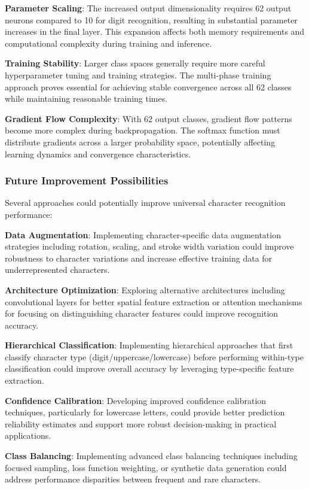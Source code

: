 \documentclass[11pt,a4paper]{report}
\begin{document}
\textbf{Parameter Scaling}: The increased output dimensionality requires 62 output neurons compared to 10 for digit recognition, resulting in substantial parameter increases in the final layer. This expansion affects both memory requirements and computational complexity during training and inference.

\textbf{Training Stability}: Larger class spaces generally require more careful hyperparameter tuning and training strategies. The multi-phase training approach proves essential for achieving stable convergence across all 62 classes while maintaining reasonable training times.

\textbf{Gradient Flow Complexity}: With 62 output classes, gradient flow patterns become more complex during backpropagation. The softmax function must distribute gradients across a larger probability space, potentially affecting learning dynamics and convergence characteristics.

\subsubsection{Future Improvement Possibilities}

Several approaches could potentially improve universal character recognition performance:

\textbf{Data Augmentation}: Implementing character-specific data augmentation strategies including rotation, scaling, and stroke width variation could improve robustness to character variations and increase effective training data for underrepresented characters.

\textbf{Architecture Optimization}: Exploring alternative architectures including convolutional layers for better spatial feature extraction or attention mechanisms for focusing on distinguishing character features could improve recognition accuracy.

\textbf{Hierarchical Classification}: Implementing hierarchical approaches that first classify character type (digit/uppercase/lowercase) before performing within-type classification could improve overall accuracy by leveraging type-specific feature extraction.

\textbf{Confidence Calibration}: Developing improved confidence calibration techniques, particularly for lowercase letters, could provide better prediction reliability estimates and support more robust decision-making in practical applications.

\textbf{Class Balancing}: Implementing advanced class balancing techniques including focused sampling, loss function weighting, or synthetic data generation could address performance disparities between frequent and rare characters.
\end{document}
